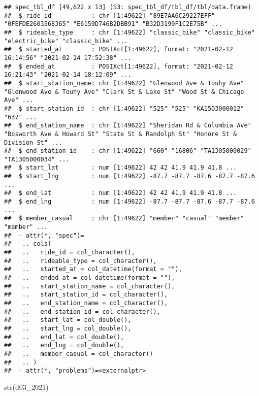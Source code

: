 \documentclass[
]{article}
\newenvironment{Shaded}{\begin{snugshade}}{\end{snugshade}}
\newcommand{\FunctionTok}[1]{\textcolor[rgb]{0.00,0.00,0.00}{#1}}
\newcommand{\NormalTok}[1]{#1}
\begin{document}
\begin{verbatim}
## spec_tbl_df [49,622 x 13] (S3: spec_tbl_df/tbl_df/tbl/data.frame)
##  $ ride_id           : chr [1:49622] "89E7AA6C29227EFF" "0FEFDE2603568365" "E6159D746B2DBB91" "B32D3199F1C2E75B" ...
##  $ rideable_type     : chr [1:49622] "classic_bike" "classic_bike" "electric_bike" "classic_bike" ...
##  $ started_at        : POSIXct[1:49622], format: "2021-02-12 16:14:56" "2021-02-14 17:52:38" ...
##  $ ended_at          : POSIXct[1:49622], format: "2021-02-12 16:21:43" "2021-02-14 18:12:09" ...
##  $ start_station_name: chr [1:49622] "Glenwood Ave & Touhy Ave" "Glenwood Ave & Touhy Ave" "Clark St & Lake St" "Wood St & Chicago Ave" ...
##  $ start_station_id  : chr [1:49622] "525" "525" "KA1503000012" "637" ...
##  $ end_station_name  : chr [1:49622] "Sheridan Rd & Columbia Ave" "Bosworth Ave & Howard St" "State St & Randolph St" "Honore St & Division St" ...
##  $ end_station_id    : chr [1:49622] "660" "16806" "TA1305000029" "TA1305000034" ...
##  $ start_lat         : num [1:49622] 42 42 41.9 41.9 41.8 ...
##  $ start_lng         : num [1:49622] -87.7 -87.7 -87.6 -87.7 -87.6 ...
##  $ end_lat           : num [1:49622] 42 42 41.9 41.9 41.8 ...
##  $ end_lng           : num [1:49622] -87.7 -87.7 -87.6 -87.7 -87.6 ...
##  $ member_casual     : chr [1:49622] "member" "casual" "member" "member" ...
##  - attr(*, "spec")=
##   .. cols(
##   ..   ride_id = col_character(),
##   ..   rideable_type = col_character(),
##   ..   started_at = col_datetime(format = ""),
##   ..   ended_at = col_datetime(format = ""),
##   ..   start_station_name = col_character(),
##   ..   start_station_id = col_character(),
##   ..   end_station_name = col_character(),
##   ..   end_station_id = col_character(),
##   ..   start_lat = col_double(),
##   ..   start_lng = col_double(),
##   ..   end_lat = col_double(),
##   ..   end_lng = col_double(),
##   ..   member_casual = col_character()
##   .. )
##  - attr(*, "problems")=<externalptr>
\end{verbatim}

\begin{Shaded}
\begin{Highlighting}[]
\FunctionTok{str}\NormalTok{(d03\_2021)}
\end{Highlighting}
\end{Shaded}
\end{document}
